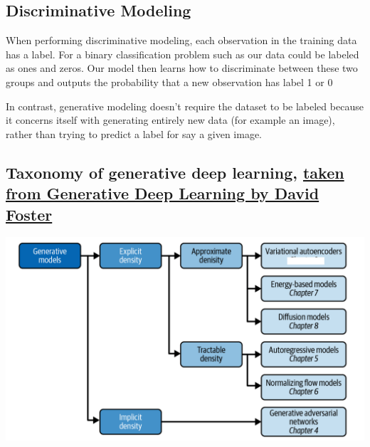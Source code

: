 \documentclass[%
oneside,                 %
final,                   %
10pt]{article}
\begin{document}
\subsection{Discriminative Modeling}

When performing discriminative modeling, each observation in the
training data has a label. For a binary classification problem such as
our data could be labeled as ones and zeros. Our model then learns how to
discriminate between these two groups and outputs the probability that
a new observation has label 1 or 0

In contrast, generative modeling doesn’t require the dataset to be
labeled because it concerns itself with generating entirely new
data (for example an image), rather than trying to predict a label for say  a given image.

\subsection{Taxonomy of generative deep learning, \href{{https://www.oreilly.com/library/view/generative-deep-learning/9781098134174/ch01.html}}{taken from Generative Deep Learning by David Foster}}

\vspace{6mm}

\centerline{\includegraphics[width=1.0\linewidth]{figures/generativemodels.png}}

\vspace{6mm}

\end{document}

